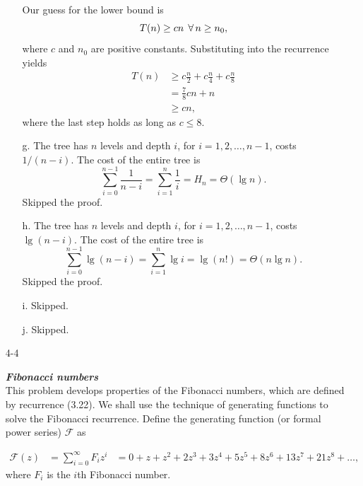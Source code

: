 \begin{enumerate}
\begin{framed}
\begin{enumerate}
      Our guess for the lower bound is
      \[
      T(n) \ge c n \; \operatorname{\forall} n \ge n_0,
      \]
      where $c$ and $n_0$ are positive constants. Substituting into the recurrence
      yields
      \begin{equation*}
      \begin{aligned}
        T(n) &\ge c \frac{n}{2} + c \frac{n}{4} + c \frac{n}{8}\\
             &= \frac{7}{8} cn + n\\
             &\ge cn,
      \end{aligned}
      \end{equation*}
      where the last step holds as long as $c \le 8$.
    \item[g.] The tree has $n$ levels and depth $i$, for
      $i = 1, 2, \dots, n - 1$, costs $1/(n - i)$. The cost of the entire tree
      is
      \[
        \sum_{i = 0}^{n - 1} \frac{1}{n - i} = \sum_{i = 1}^{n} \frac{1}{i} = H_n = \Theta(\lg n).
      \]
      Skipped the proof.
    \item[h.] The tree has $n$ levels and depth $i$, for
      $i = 1, 2, \dots, n - 1$, costs $\lg(n - i)$. The cost of the entire tree
      is
      \[
        \sum_{i = 0}^{n - 1} \lg(n - i) = \sum_{i = 1}^{n} \lg i = \lg(n!) = \Theta(n \lg n).
      \]
      Skipped the proof.
    \item[i.] Skipped.
    \item[j.] Skipped.
  \end{enumerate}
\end{framed}

\newpage

\item[4{-}4]{\textbf{\emph{Fibonacci numbers}}\\
This problem develops properties of the Fibonacci numbers, which are defined by
recurrence (3.22). We shall use the technique of generating functions to solve
the Fibonacci recurrence. Define the generating function (or formal power
series) $\mathcal{F}$ as

\begin{equation*}
\begin{aligned}
  \mathcal{F}(z) &= \sum_{i = 0}^\infty F_i z^i
                 &= 0 + z + z^2 + 2z^3 + 3z^4 + 5z^5 + 8z^6 + 13z^7 + 21z^8 + \dots,
\end{aligned}
\end{equation*}
where $F_i$ is the $i$th Fibonacci number.

}
\end{enumerate}
